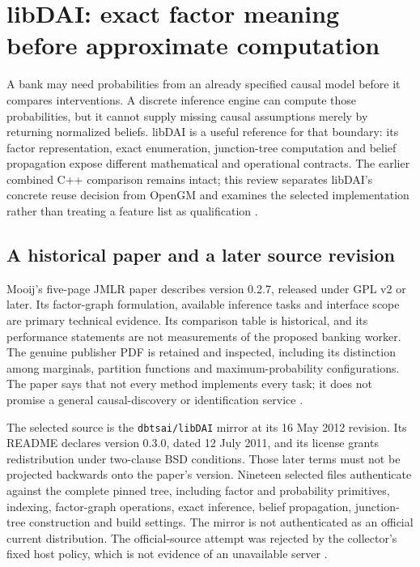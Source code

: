 \section{libDAI: exact factor meaning before approximate computation}
\label{sec:exec24-libdai-reuse}

A bank may need probabilities from an already specified causal model before
it compares interventions. A discrete inference engine can compute those
probabilities, but it cannot supply missing causal assumptions merely by
returning normalized beliefs. libDAI is a useful reference for that boundary:
its factor representation, exact enumeration, junction-tree computation and
belief propagation expose different mathematical and operational contracts.
The earlier combined C++ comparison remains intact; this review separates
libDAI's concrete reuse decision from OpenGM and examines the selected
implementation rather than treating a feature list as qualification
\cite{exec13_cxx_inference,exec24_libdai_source}.

\subsection{A historical paper and a later source revision}
Mooij's five-page JMLR paper describes version 0.2.7, released under GPL v2 or
later. Its factor-graph formulation, available inference tasks and interface
scope are primary technical evidence. Its comparison table is historical,
and its performance statements are not measurements of the proposed banking
worker. The genuine publisher PDF is retained and inspected, including its
distinction among marginals, partition functions and maximum-probability
configurations. The paper says that not every method implements every task;
it does not promise a general causal-discovery or identification service
\cite{exec24_libdai_paper}.

The selected source is the \texttt{dbtsai/libDAI} mirror at its 16 May 2012
revision. Its README declares version 0.3.0, dated 12 July 2011, and its
license grants redistribution under two-clause BSD conditions. Those later
terms must not be projected backwards onto the paper's version. Nineteen
selected files authenticate against the complete pinned tree, including
factor and probability primitives, indexing, factor-graph operations, exact
inference, belief propagation, junction-tree construction and build settings.
The mirror is not authenticated as an official current distribution. The
official-source attempt was rejected by the collector's fixed host policy,
which is not evidence of an unavailable server
\cite{exec24_libdai_source,exec24_libdai_choice}.

